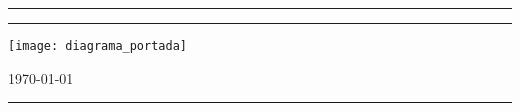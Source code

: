 %
%
%
%
%
%
%



\thispagestyle{plain}

\begin{titlepage}
	\centering
	\rule{\textwidth}{1.5pt} 
		{\huge\bfseries		\titulo 	\par}
	\rule{\textwidth}{1.5pt} \par
	\vspace{3cm}
		{\huge	\autor \par}
	\vspace{3cm}	
		{\texttt{[image: diagrama\_portada]} \par}
	\vspace{2.5cm}
		{\huge	\today \par}
	\rule{\textwidth}{1.5pt}
\end{titlepage}

